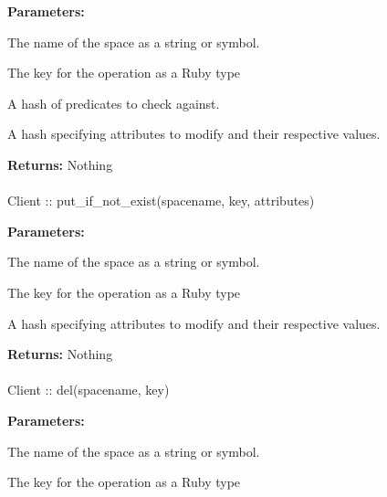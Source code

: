 \noindent\textbf{Parameters:}
\begin{description}[labelindent=\widthof{{predicates}},leftmargin=*,noitemsep,nolistsep,align=right]
\item[spacename] The name of the space as a string or symbol.
\item[key] The key for the operation as a Ruby type
\item[predicates] A hash of predicates to check against.
\item[attributes] A hash specifying attributes to modify and their respective values.
\end{description}

\noindent\textbf{Returns:}
Nothing

\paragraph{}
\begin{ccode}
Client :: put_if_not_exist(spacename, key, attributes)
\end{ccode}
\funcdesc 

\noindent\textbf{Parameters:}
\begin{description}[labelindent=\widthof{{attributes}},leftmargin=*,noitemsep,nolistsep,align=right]
\item[spacename] The name of the space as a string or symbol.
\item[key] The key for the operation as a Ruby type
\item[attributes] A hash specifying attributes to modify and their respective values.
\end{description}

\noindent\textbf{Returns:}
Nothing

\paragraph{}
\begin{ccode}
Client :: del(spacename, key)
\end{ccode}
\funcdesc 

\noindent\textbf{Parameters:}
\begin{description}[labelindent=\widthof{{spacename}},leftmargin=*,noitemsep,nolistsep,align=right]
\item[spacename] The name of the space as a string or symbol.
\item[key] The key for the operation as a Ruby type
\end{description}

